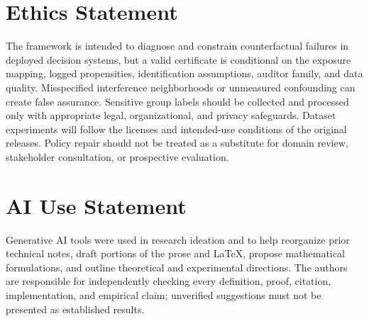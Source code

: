 \documentclass{article}
\theoremstyle{plain}
\theoremstyle{definition}
\theoremstyle{remark}
\begin{document}
\section*{Ethics Statement}
The framework is intended to diagnose and constrain counterfactual failures in deployed decision systems, but a valid certificate is conditional on the exposure mapping, logged propensities, identification assumptions, auditor family, and data quality. Misspecified interference neighborhoods or unmeasured confounding can create false assurance. Sensitive group labels should be collected and processed only with appropriate legal, organizational, and privacy safeguards. Dataset experiments will follow the licenses and intended-use conditions of the original releases. Policy repair should not be treated as a substitute for domain review, stakeholder consultation, or prospective evaluation.

\section*{AI Use Statement}
Generative AI tools were used in research ideation and to help reorganize prior technical notes, draft portions of the prose and LaTeX, propose mathematical formulations, and outline theoretical and experimental directions. The authors are responsible for independently checking every definition, proof, citation, implementation, and empirical claim; unverified suggestions must not be presented as established results.




\appendix

\end{document}
